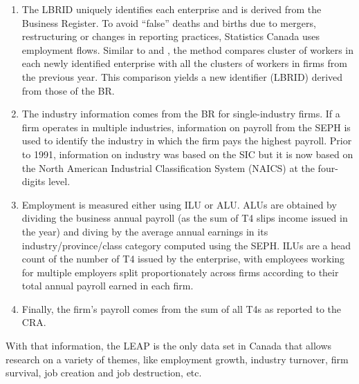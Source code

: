 \begin{enumerate}

\item The LBRID uniquely identifies each enterprise and is derived from the Business Register. To avoid ``false'' deaths and births due to mergers, restructuring or changes in reporting practices, Statistics Canada uses employment flows. Similar to \citet{BenedettoEtAl2007} and \citet{RePEc:iab:iabfme:201006_en}, the method  compares cluster of workers in each newly identified enterprise with all the clusters of workers in firms from the previous year. This comparison yields a new identifier (LBRID) derived from those of the \ac{BR}.

\item The industry information comes from the \ac{BR} for single-industry firms. If a firm operates in multiple industries, information on payroll from the \ac{SEPH} is used to identify the industry in which the firm pays the highest payroll. Prior to 1991, information on industry was based on the SIC but it is now based on the  North American Industrial Classification System (NAICS) at the four-digits level. 

\item Employment is measured either using \ac{ILU} or \ac{ALU}. \acp{ALU} are obtained by dividing the business annual payroll (as the sum of T4 slips income issued in the year) and diving by the average annual earnings in its industry/province/class category computed using the \ac{SEPH}. \acp{ILU} are a head count of the number of T4 issued by the enterprise, with employees working for multiple employers split proportionately across firms according to their total annual payroll earned in each firm. 

\item Finally, the firm's payroll comes from the sum of all T4s as reported to the CRA.

\end{enumerate}
With that information, the \ac{LEAP} is the only data set in Canada  that allows research on a variety of themes, like employment growth, industry turnover, firm survival, job creation and job destruction, etc. 
